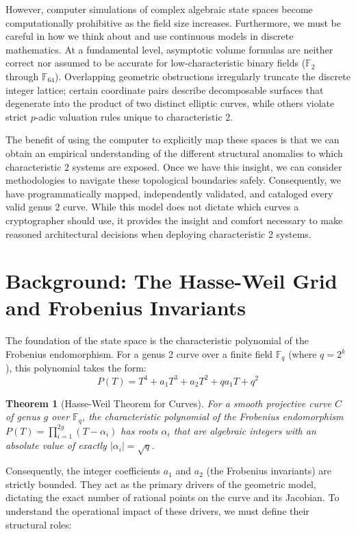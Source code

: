 \documentclass[11pt,letterpaper]{article}
\newtheorem{theorem}{Theorem}[section]
\begin{document}
However, computer simulations of complex algebraic state spaces become computationally prohibitive as the field size increases. Furthermore, we must be careful in how we think about and use continuous models in discrete mathematics. At a fundamental level, asymptotic volume formulas are neither correct nor assumed to be accurate for low-characteristic binary fields ($\mathbb{F}_2$ through $\mathbb{F}_{64}$). Overlapping geometric obstructions irregularly truncate the discrete integer lattice; certain coordinate pairs describe decomposable surfaces that degenerate into the product of two distinct elliptic curves, while others violate strict $p$-adic valuation rules unique to characteristic 2.

The benefit of using the computer to explicitly map these spaces is that we can obtain an empirical understanding of the different structural anomalies to which characteristic 2 systems are exposed. Once we have this insight, we can consider methodologies to navigate these topological boundaries safely. Consequently, we have programmatically mapped, independently validated, and cataloged every valid genus 2 curve. While this model does not dictate which curves a cryptographer should use, it provides the insight and comfort necessary to make reasoned architectural decisions when deploying characteristic 2 systems.

\section{Background: The Hasse-Weil Grid and Frobenius Invariants}
The foundation of the state space is the characteristic polynomial of the Frobenius endomorphism. For a genus 2 curve over a finite field $\mathbb{F}_q$ (where $q = 2^k$), this polynomial takes the form:
\[ P(T) = T^4 + a_1 T^3 + a_2 T^2 + q a_1 T + q^2 \]

\begin{theorem}[Hasse-Weil Theorem for Curves]
For a smooth projective curve $C$ of genus $g$ over $\mathbb{F}_q$, the characteristic polynomial of the Frobenius endomorphism $P(T) = \prod_{i=1}^{2g} (T - \alpha_i)$ has roots $\alpha_i$ that are algebraic integers with an absolute value of exactly $|\alpha_i| = \sqrt{q}$.
\end{theorem}

Consequently, the integer coefficients $a_1$ and $a_2$ (the Frobenius invariants) are strictly bounded. They act as the primary drivers of the geometric model, dictating the exact number of rational points on the curve and its Jacobian. To understand the operational impact of these drivers, we must define their structural roles:
\end{document}
